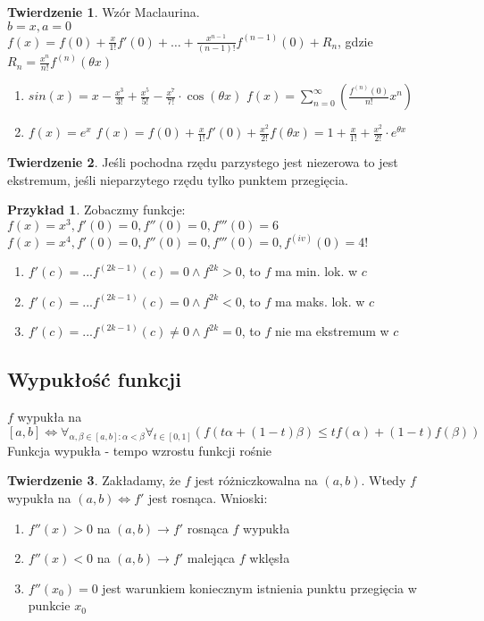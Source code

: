 \documentclass{article}
\theoremstyle{definition}
\theoremstyle{definition}
\newtheorem{tw}{Twierdzenie}[subsection]
\theoremstyle{definition}
\newtheorem{pk}{Przykład}[subsection]
\theoremstyle{definition}
\begin{document}
\begin{tw}
    Wzór Maclaurina.\\
    $b=x, a=0$\\
    $f(x)=f(0)+\frac{x}{1!} f'(0) + \dots + \frac{x^{n-1}}{(n-1)!} f^{(n-1)}(0) + R_n$, gdzie $R_n = \frac{x^n}{n!} f^{(n)}(\theta x)$
    \begin{enumerate}
        \item $sin(x)=x-\frac{x^3}{3!}+\frac{x^5}{5!}-\frac{x^7}{7!} \cdot \cos(\theta x)$
        $f(x)=\sum_{n=0}^{\infty} \left(\frac{f^{(n)}(0)}{n!} x^n\right)$
        \item $f(x)=e^x$
        $f(x)=f(0)+\frac{x}{1!} f'(0) + \frac{x^2}{2!} f(\theta x) = 1 + \frac{x}{1!} + \frac{x^2}{2!}\cdot e^{\theta x}$
    \end{enumerate}
\end{tw}

\begin{tw}
    Jeśli pochodna rzędu parzystego jest niezerowa to jest ekstremum, jeśli nieparzytego rzędu tylko punktem przegięcia.
\end{tw}

\begin{pk}
    Zobaczmy funkcje:\\
    $f(x)=x^3, f'(0)=0, f''(0)=0, f'''(0)=6$\\
    $f(x)=x^4, f'(0)=0, f''(0)=0, f'''(0)=0, f^{(iv)}(0)=4!$
\end{pk}

\begin{enumerate}
    \item $f'(c)=...f^{(2k-1)}(c)=0 \land f^{2k} > 0$, to $f$ ma min. lok. w $c$
    \item $f'(c)=...f^{(2k-1)}(c)=0 \land f^{2k} < 0$, to $f$ ma maks. lok. w $c$
    \item $f'(c)=...f^{(2k-1)}(c) \neq 0 \land f^{2k} = 0$, to $f$ nie ma ekstremum w $c$
\end{enumerate}

\subsection{Wypukłość funkcji}

$f$ wypukła na $[a,b] \iff \forall_{\alpha, \beta \in [a,b]: \alpha < \beta} \forall_{t\in[0,1]} \left(f(t\alpha + (1-t)\beta) \leq tf(\alpha) + (1-t)f(\beta)\right)$\\
Funkcja wypukła - tempo wzrostu funkcji rośnie

\begin{tw}
    Zakładamy, że $f$ jest różniczkowalna na $(a,b)$. Wtedy $f$ wypukła na $(a,b) \iff f'$ jest rosnąca. Wnioski:
    \begin{enumerate}
        \item $f''(x)>0$ na $(a,b) \rightarrow f'$ rosnąca $f$ wypukła 
        \item $f''(x)<0$ na $(a,b) \rightarrow f'$ malejąca $f$ wklęsła 
        \item $f''(x_0)=0$ jest warunkiem koniecznym istnienia punktu przegięcia w punkcie $x_0$
    \end{enumerate}
\end{tw}
\end{document}
